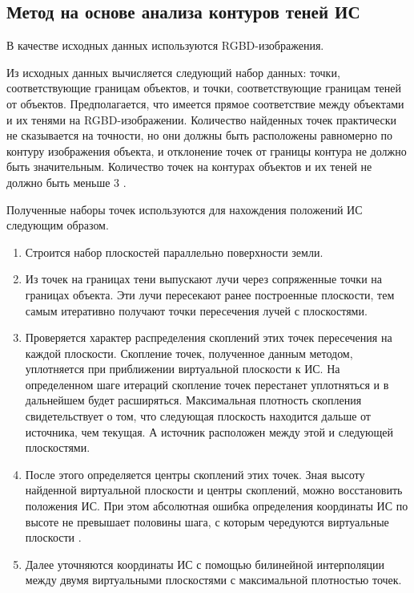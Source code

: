 \subsection{Метод на основе анализа контуров теней ИС}

В качестве исходных данных используются RGBD-изображения.

Из исходных данных вычисляется следующий набор данных: точки, соответствующие границам объектов, и точки, соответствующие границам теней от объектов. Предполагается, что имеется прямое соответствие между объектами и их тенями на RGBD-изображении. Количество найденных точек практически не сказывается на точности, но они должны быть расположены равномерно по контуру изображения объекта, и отклонение точек от границы контура не должно быть значительным. Количество точек на контурах объектов и их теней не должно быть меньше 3 \cite{shadow_contours_method}.

Полученные наборы точек используются для нахождения положений ИС следующим образом. 

\begin{enumerate}
	\item Строится набор плоскостей параллельно поверхности земли.
	\item Из точек на границах тени выпускают лучи через сопряженные точки на границах объекта. Эти лучи пересекают ранее построенные плоскости, тем самым итеративно получают точки пересечения лучей с плоскостями.
	\item Проверяется характер распределения скоплений этих точек пересечения на каждой плоскости. Скопление точек, полученное данным методом, уплотняется при приближении виртуальной плоскости к ИС. На определенном шаге итераций скопление точек перестанет уплотняться и в дальнейшем будет расширяться. Максимальная плотность скопления свидетельствует о том, что следующая плоскость находится дальше от источника, чем текущая. А источник расположен между этой и следующей плоскостями.
	\item После этого определяется центры скоплений этих точек. Зная высоту найденной виртуальной плоскости и центры скоплений, можно восстановить положения ИС.	При этом абсолютная ошибка определения координаты ИС по высоте не превышает половины шага, с которым чередуются виртуальные плоскости  \cite{shadow_contours_method}.
	\item Далее уточняются координаты ИС с помощью билинейной интерполяции между двумя виртуальными плоскостями с максимальной плотностью точек.
\end{enumerate}

